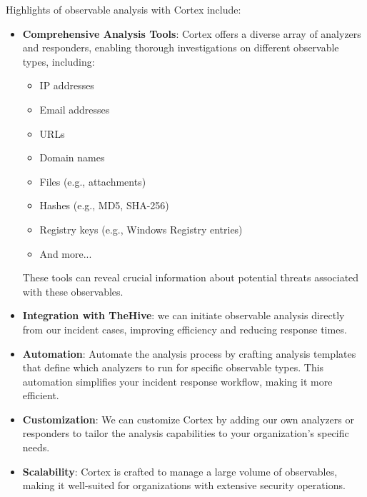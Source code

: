 \documentclass{article}
\begin{document}
Highlights of observable analysis with Cortex include:


\begin{itemize}
  \item \textbf{Comprehensive Analysis Tools}:
  Cortex offers a diverse array of analyzers and responders, enabling thorough investigations on different observable types, including:
    \begin{itemize}
        \item IP addresses
        \item Email addresses
        \item URLs
        \item Domain names
        \item Files (e.g., attachments)
        \item Hashes (e.g., MD5, SHA-256)
        \item Registry keys (e.g., Windows Registry entries)
        \item And more...
    \end{itemize}
    These tools can reveal crucial information about potential threats associated with these observables.

  \item \textbf{Integration with TheHive}:
  we can initiate observable analysis directly from our incident cases, improving efficiency and reducing response times.
  
  \item \textbf{Automation}:
  Automate the analysis process by crafting analysis templates that define which analyzers to run for specific observable types. This automation simplifies your incident response workflow, making it more efficient.

  \item \textbf{Customization}: 
  We can customize Cortex by adding our own analyzers or responders to tailor the analysis capabilities to your organization's specific needs.
  
  \item \textbf{Scalability}: 
 Cortex is crafted to manage a large volume of observables, making it well-suited for organizations with extensive security operations.
  

\end{itemize}
\end{document}
